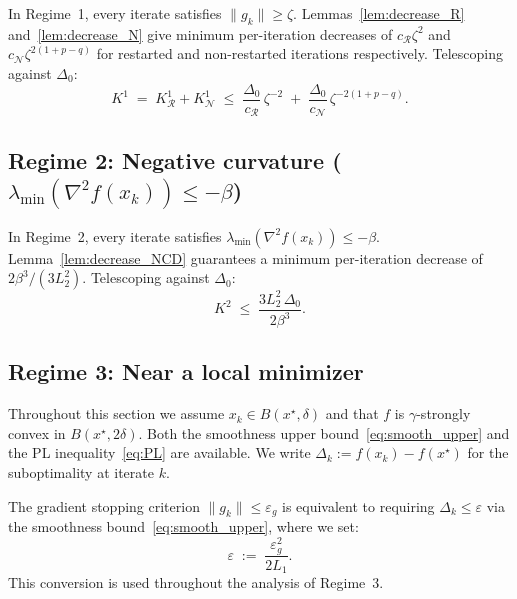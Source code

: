 \documentclass{article}
\begin{document}
In Regime~1, every iterate satisfies $\|g_k\|\geq\zeta$.
Lemmas~\ref{lem:decrease_R} and~\ref{lem:decrease_N} give minimum
per-iteration decreases of $c_{\mathcal{R}}\zeta^2$ and
$c_{\mathcal{N}}\zeta^{2(1+p-q)}$ for restarted and non-restarted
iterations respectively. Telescoping against $\Delta_0$:
\begin{equation}
\label{eq:regime1}
K^1 \;=\; K^1_{\mathcal{R}}+K^1_{\mathcal{N}}
\;\leq\;
\frac{\Delta_0}{c_{\mathcal{R}}}\,\zeta^{-2}
\;+\;
\frac{\Delta_0}{c_{\mathcal{N}}}\,\zeta^{-2(1+p-q)}.
\end{equation}

\subsection{Regime 2: Negative curvature
            ($\lambda_{\min}(\nabla^2 f(x_k))\leq-\beta$)}

In Regime~2, every iterate satisfies
$\lambda_{\min}(\nabla^2 f(x_k))\leq-\beta$.
Lemma~\ref{lem:decrease_NCD} guarantees a minimum per-iteration
decrease of $2\beta^3/(3L_2^2)$. Telescoping against $\Delta_0$:
\begin{equation}
\label{eq:regime2}
K^2 \;\leq\; \frac{3L_2^2\,\Delta_0}{2\beta^3}.
\end{equation}

\subsection{Regime 3: Near a local minimizer}
\label{subsec:regime3}

Throughout this section we assume $x_k\in B(x^\star,\delta)$ and
that $f$ is $\gamma$-strongly convex in $B(x^\star,2\delta)$. Both
the smoothness upper bound~\eqref{eq:smooth_upper} and the PL
inequality~\eqref{eq:PL} are available. We write
$\Delta_k:=f(x_k)-f(x^\star)$ for the suboptimality at iterate $k$.

The gradient stopping criterion $\|g_k\|\leq\varepsilon_g$ is
equivalent to requiring $\Delta_k\leq\varepsilon$ via the smoothness
bound~\eqref{eq:smooth_upper}, where we set:
\begin{equation}
\label{eq:eps_convert}
\varepsilon \;:=\; \frac{\varepsilon_g^2}{2L_1}.
\end{equation}
This conversion is used throughout the analysis of Regime~3.
\end{document}

